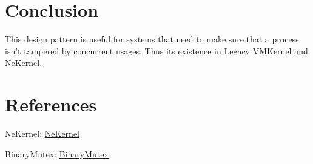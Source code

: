 \documentclass{article}
\begin{document}
\section{Conclusion}

{This design pattern is useful for systems that need to make sure that a process isn't tampered by concurrent usages.
Thus its existence in Legacy VMKernel and NeKernel.}

\section{References}

{NeKernel}: \href{https://github.com/ne-app-eu/krnl}{NeKernel}

{BinaryMutex}: \href{https://github.com/ne-app-eu/krnl/blob/private/src/minkernel/KernelKit/BinaryMutex.h}{BinaryMutex}
\end{document}
